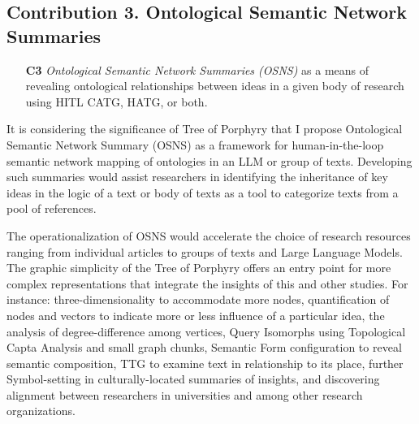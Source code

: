 \subsection{Contribution 3. Ontological Semantic Network Summaries}
\begin{enumerate}
     \item[\textbf{C3}] \textit{Ontological Semantic Network Summaries (OSNS)} as a means of revealing ontological relationships between ideas in a given body of research using HITL CATG, HATG, or both.

\end{enumerate}

It is considering the significance of Tree of Porphyry that I propose Ontological Semantic Network Summary (OSNS) as a framework for human-in-the-loop semantic network mapping of ontologies in an LLM or group of texts. Developing such summaries would assist researchers in identifying the inheritance of key ideas in the logic of a text or body of texts as a tool to categorize texts from a pool of references.

The operationalization of OSNS would accelerate the choice of research resources ranging from individual articles to groups of texts and Large Language Models. The graphic simplicity of the Tree of Porphyry offers an entry point for more complex representations that integrate the insights of this and other studies. For instance: three-dimensionality to accommodate more nodes, quantification of nodes and vectors to indicate more or less influence of a particular idea, the analysis of degree-difference among vertices, Query Isomorphs using Topological Capta Analysis and small graph chunks, Semantic Form configuration to reveal semantic composition, TTG to examine text in relationship to its place, further Symbol-setting in culturally-located summaries of insights, and discovering alignment between researchers in universities and among other research organizations.

